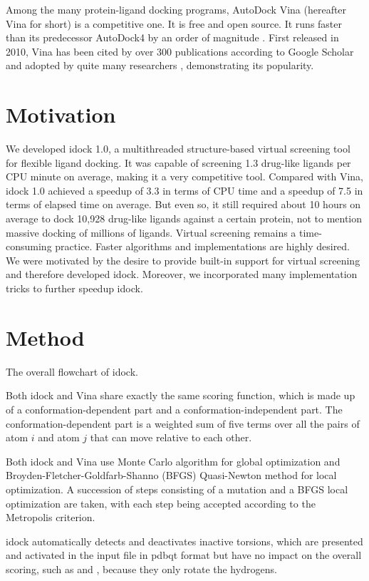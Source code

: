 \documentclass[10pt,conference,compsocconf]{../IEEEtran}
\begin{document}
Among the many protein-ligand docking programs, AutoDock Vina \cite{595} (hereafter Vina for short) is a competitive one. It is free and open source. It runs faster than its predecessor AutoDock4 \cite{596} by an order of magnitude \cite{556}. First released in 2010, Vina has been cited by over 300 publications according to Google Scholar and adopted by quite many researchers \cite{609}, demonstrating its popularity.

\section{Motivation}

We developed idock 1.0, a multithreaded structure-based virtual screening tool for flexible ligand docking. It was capable of screening 1.3 drug-like ligands per CPU minute on average, making it a very competitive tool. Compared with Vina, idock 1.0 achieved a speedup of 3.3 in terms of CPU time and a speedup of 7.5 in terms of elapsed time on average. But even so, it still required about 10 hours on average to dock 10,928 drug-like ligands against a certain protein, not to mention massive docking of millions of ligands. Virtual screening remains a time-consuming practice. Faster algorithms and implementations are highly desired. We were motivated by the desire to provide built-in support for virtual screening and therefore developed idock. Moreover, we incorporated many implementation tricks to further speedup idock.

\section{Method}

The overall flowchart of idock.

Both idock and Vina share exactly the same scoring function, which is made up of a conformation-dependent part and a conformation-independent part. The conformation-dependent part is a weighted sum of five terms over all the pairs of atom $i$ and atom $j$ that can move relative to each other.

Both idock and Vina use Monte Carlo algorithm for global optimization and Broyden-Fletcher-Goldfarb-Shanno (BFGS) \cite{786} Quasi-Newton method for local optimization. A succession of steps consisting of a mutation and a BFGS local optimization are taken, with each step being accepted according to the Metropolis criterion.

idock automatically detects and deactivates inactive torsions, which are presented and activated in the input file in pdbqt format but have no impact on the overall scoring, such as  and , because they only rotate the hydrogens.
\end{document}
